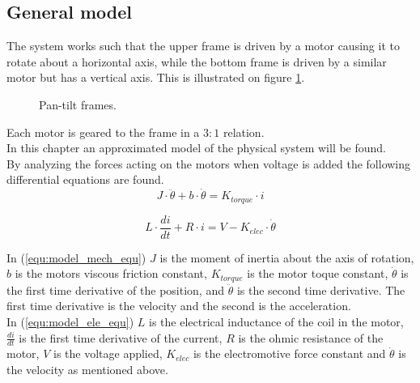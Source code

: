 \documentclass[../../main]{subfiles}
\begin{document}
\subsection{General model}
\label{ch:General_model}
The system works such that the upper frame is driven by a motor causing it to rotate about a horizontal axis, while the bottom frame is driven by a similar motor but has a vertical axis. This is illustrated on figure \ref{fig:pan-tilt_frames}.

  \begin{figure}[h]
    \centering
  \def\svgwidth{0.4\columnwidth}
  \qquad
  \def\svgwidth{0.2\columnwidth}
  \caption{Pan-tilt frames.}
  \label{fig:pan-tilt_frames}
  \end{figure}

Each motor is geared to the frame in a $3:1$ relation.\\

In this chapter an approximated model of the physical system will be found.\\

By analyzing the forces acting on the motors when voltage is added the following differential equations are found.\\

\begin{equation}
  \label{equ:model_mech_equ}
  J\cdot \ddot \theta + b\cdot \dot \theta = K_{torque}\cdot i
\end{equation}

\begin{equation}
  \label{equ:model_ele_equ}
  L\cdot \frac{di}{dt} + R\cdot i = V - K_{elec}\cdot \dot \theta
\end{equation}

In (\ref{equ:model_mech_equ}) $J$ is the moment of inertia about the axis of rotation, $b$ is the motors viscous friction constant, $K_{torque}$ is the motor toque constant, $\dot \theta$ is the first time derivative of the position, and $\ddot \theta$ is the second time derivative. The first time derivative is the velocity and the second is the acceleration.\\
In (\ref{equ:model_ele_equ}) $L$ is the electrical inductance of the coil in the motor, $\frac{di}{dt}$ is the first time derivative of the current, $R$ is the ohmic resistance of the motor, $V$ is the voltage applied, $K_{elec}$ is the electromotive force constant and $\dot \theta$ is the velocity as mentioned above.\\
\end{document}
